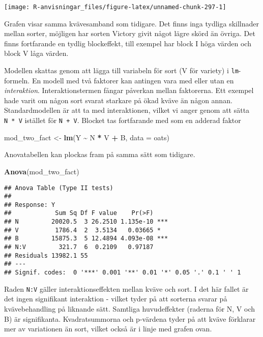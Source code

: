 \documentclass[
]{book}
\newenvironment{Shaded}{\begin{snugshade}}{\end{snugshade}}
\newcommand{\AttributeTok}[1]{\textcolor[rgb]{0.13,0.29,0.53}{#1}}
\newcommand{\FunctionTok}[1]{\textcolor[rgb]{0.13,0.29,0.53}{\textbf{#1}}}
\newcommand{\NormalTok}[1]{#1}
\newcommand{\OtherTok}[1]{\textcolor[rgb]{0.56,0.35,0.01}{#1}}
\newcommand{\SpecialCharTok}[1]{\textcolor[rgb]{0.81,0.36,0.00}{\textbf{#1}}}
\theoremstyle{definition}
\theoremstyle{definition}
\theoremstyle{definition}
\theoremstyle{definition}
\theoremstyle{remark}
\begin{document}
\begin{center}\texttt{[image: R-anvisningar\_files/figure-latex/unnamed-chunk-297-1]} \end{center}

Grafen visar samma kvävesamband som tidigare. Det finns inga tydliga skillnader mellan sorter, möjligen har sorten Victory givit något lägre skörd än övriga. Det finns fortfarande en tydlig blockeffekt, till exempel har block I höga värden och block V låga värden.

Modellen skattas genom att lägga till variabeln för sort (V för variety) i \texttt{lm}-formeln. En modell med två faktorer kan antingen vara med eller utan en \emph{interaktion}. Interaktionstermen fångar påverkan mellan faktorerna. Ett exempel hade varit om någon sort svarat starkare på ökad kväve än någon annan. Standardmodellen är att ta med interaktionen, vilket vi anger genom att sätta \texttt{N\ *\ V} istället för \texttt{N\ +\ V}. Blocket tas fortfarande med som en adderad faktor

\begin{Shaded}
\begin{Highlighting}[]
\NormalTok{mod\_two\_fact }\OtherTok{\textless{}{-}} \FunctionTok{lm}\NormalTok{(Y }\SpecialCharTok{\textasciitilde{}}\NormalTok{ N }\SpecialCharTok{*}\NormalTok{ V }\SpecialCharTok{+}\NormalTok{ B, }\AttributeTok{data =}\NormalTok{ oats)}
\end{Highlighting}
\end{Shaded}

Anovatabellen kan plockas fram på samma sätt som tidigare.

\begin{Shaded}
\begin{Highlighting}[]
\FunctionTok{Anova}\NormalTok{(mod\_two\_fact)}
\end{Highlighting}
\end{Shaded}

\begin{verbatim}
## Anova Table (Type II tests)
## 
## Response: Y
##            Sum Sq Df F value    Pr(>F)    
## N         20020.5  3 26.2510 1.135e-10 ***
## V          1786.4  2  3.5134   0.03665 *  
## B         15875.3  5 12.4894 4.093e-08 ***
## N:V         321.7  6  0.2109   0.97187    
## Residuals 13982.1 55                      
## ---
## Signif. codes:  0 '***' 0.001 '**' 0.01 '*' 0.05 '.' 0.1 ' ' 1
\end{verbatim}

Raden \texttt{N:V} gäller interaktionseffekten mellan kväve och sort. I det här fallet är det ingen signifikant interaktion - vilket tyder på att sorterna svarar på kvävebehandling på liknande sätt. Samtliga huvudeffekter (raderna för N, V och B) är signifikanta. Kvadratsummorna och p-värdena tyder på att kväve förklarar mer av variationen än sort, vilket också är i linje med grafen ovan.
\end{document}

